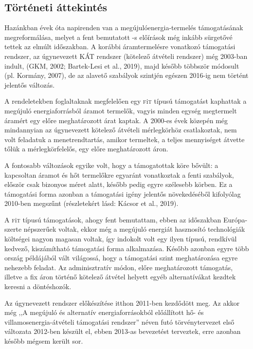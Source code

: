\documentclass[twoside, magyar, showtrims]{corvinusphd}
\newcommand{\fit}{\textsc{f}i\textsc{t}\index{\textsc{f}i\textsc{t}} }
\begin{document}
\subsection{Történeti áttekintés}

Hazánkban évek óta napirenden van a megújulóenergia-termelés 
támogatásának megreformálása, melyet a fent bemutatott -s előírások
még inkább sürgetővé tettek az elmúlt időszakban.
A korábbi áramtermelésre vonatkozó támogatási rendszer,
az úgynevezett KÁT rendszer (kötelező átvételi rendszer)
még 2003-ban indult, (GKM, 2002; Bartek-Lesi et al., 2019), 
majd később többször módosult (pl. Kormány, 2007), de az
alavető szabályok szintjén egészen 2016-ig nem történt jelentős változás.

A rendeletekben foglaltaknak megfelelően egy \fit típusú támogatást
kaphattak a megújuló energiaforrásból áramot termelők, vagyis minden egység megtermelt
áramért egy előre meghatározott árat kaptak.
A 2000-es évek közepén még mindannyian az úgynevezett
kötelező átvételi mérlegkörhöz csatlakoztak,
nem volt feladatuk a menetrendtartás, amikor termeltek,
a teljes mennyiséget átvette tőlük a mérlegkörfelelős,
egy előre meghatározott áron. 

A fontosabb változások egyike volt, hogy a támogatottak köre bővült:
a kapcsoltan áramot és hőt termelőkre egyaránt vonatkoztak
a fenti szabályok, először csak bizonyos méret alatt,
később pedig egyre szélesebb körben.
Ez a támogatási forma azonban a támogatási igény
jelentős növekedéséből kifolyólag 2010-ben megszűnt
(részletekért lásd: Kácsor et al., 2019).

A \fit típusú támogatások, ahogy fent bemutattam,
ebben az időszakban Európa-szerte
népszerűek voltak, ekkor még a megújuló
energiát hasznosító technológiák költségei
nagyon magasan voltak, így indokolt volt
egy ilyen típusú, rendkívül kedvező, kiszámítható
támogatási forma alkalmazása. Később azonban egyre több
ország példájából vált világossá, hogy 
a támogatási szint meghatározása egyre nehezebb feladat.
Az adminisztratív módon, előre meghatározott
támogatás, illetve a fix áron történő
kötelező átvétel helyett egyéb alternatívákat
kezdtek keresni a döntéshozók.

Az úgynevezett  rendszer előkészítése
itthon 2011-ben kezdődött meg.
Az akkor még ,,A megújuló és alternatív
energiaforrásokból előállított hő- és villamosenergia-átvételi
támogatási rendszer'' néven futó törvénytervezet első változata
2012-ben készült el, ebben 2013-as bevezetést
terveztek, erre azonban később mégsem került sor.
\end{document}
